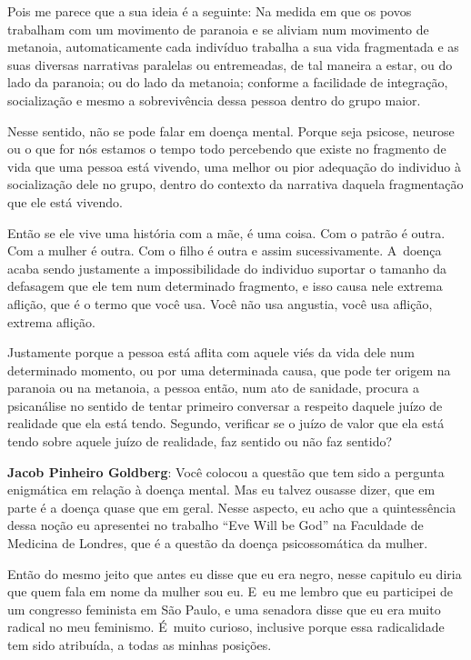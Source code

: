 Pois me parece que a sua ideia é a seguinte: Na medida em que os povos
trabalham com um movimento de paranoia e se aliviam num movimento de
metanoia, automaticamente cada indivíduo trabalha a sua vida fragmentada
e as suas diversas narrativas paralelas ou entremeadas, de tal maneira a
estar, ou do lado da paranoia; ou do lado da metanoia; conforme a
facilidade de integração, socialização e mesmo a sobrevivência dessa
pessoa dentro do grupo maior.

Nesse sentido, não se pode falar em doença mental. Porque seja psicose,
neurose ou o que for nós estamos o tempo todo percebendo que existe no
fragmento de vida que uma pessoa está vivendo, uma melhor ou pior
adequação do individuo à socialização dele no grupo, dentro do contexto
da narrativa daquela fragmentação que ele está vivendo.

 

Então se ele vive uma história com a mãe, é uma coisa. Com o patrão é
outra. Com a mulher é outra. Com o filho é outra e assim sucessivamente.
A~doença acaba sendo justamente a impossibilidade do individuo suportar
o tamanho da defasagem que ele tem num determinado fragmento, e isso
causa nele extrema aflição, que é o termo que você usa. Você não usa
angustia, você usa aflição, extrema aflição.

 

Justamente porque a pessoa está aflita com aquele viés da vida dele num
determinado momento, ou por uma determinada causa, que pode ter origem
na paranoia ou na metanoia, a pessoa então, num ato de sanidade, procura
a psicanálise no sentido de tentar primeiro conversar a respeito daquele
juízo de realidade que ela está tendo. Segundo, verificar se o juízo de
valor que ela está tendo sobre aquele juízo de realidade, faz sentido ou
não faz sentido?

 

\textbf{Jacob Pinheiro Goldberg}: Você colocou a questão que tem sido a
pergunta enigmática em relação à doença mental. Mas eu talvez ousasse
dizer, que em parte é a doença quase que em geral. Nesse aspecto, eu
acho que a quintessência dessa noção eu apresentei no trabalho ``Eve
Will be God'' na Faculdade de Medicina de Londres, que é a questão da
doença psicossomática da mulher.

 

Então do mesmo jeito que antes eu disse que eu era negro, nesse capitulo
eu diria que quem fala em nome da mulher sou eu. E~eu me lembro que eu
participei de um congresso feminista em São Paulo, e uma senadora disse
que eu era muito radical no meu feminismo. É~muito curioso, inclusive
porque essa radicalidade tem sido atribuída, a todas as minhas posições.


